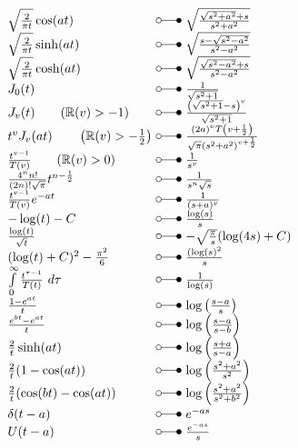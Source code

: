 \[ \begin{array}{@{}l@{ ~ \laplace ~ }l@{}}
\sqrt{\frac{2}{\pi t}} \cos(at) &
    \sqrt{\frac{\sqrt{s^2 + a^2} + s}{s^2 + a^2}} \\
\sqrt{\frac{2}{\pi t}} \sinh(at) &
    \sqrt{\frac{s - \sqrt{s^2 - a^2}}{s^2 - a^2}} \\
\sqrt{\frac{2}{\pi t}} \cosh(at) &
    \sqrt{\frac{\sqrt{s^2 - a^2} + s}{s^2 - a^2}} \\
J_0(t) &
    \frac{1}{\sqrt{s^2 + 1}} \\
J_v(t) \qquad (\mathbb{R}(v) > -1) &
    \frac{\left(\sqrt{s^2 + 1} - s\right)^v}{\sqrt{s^2 + 1}} \\
t^v J_v(at) \qquad \left(\mathbb{R}(v) > -\frac{1}{2}\right) &
    \frac{(2 a)^v T\left(v + \frac{1}{2}\right)}{\sqrt{\pi}(s^2 + a^2)^{v + \frac{1}{2}}} \\
\frac{t^{v - 1}}{T(v)} \qquad (\mathbb{R}(v) > 0) &
    \frac{1}{s^v} \\
\frac{4^n n!}{(2 n)! \sqrt{\pi}} t^{n - \frac{1}{2}} &
    \frac{1}{s^n \sqrt{s}} \\
\frac{t^{v - 1}}{T(v)} e^{-at} &
    \frac{1}{(s + a)^v} \\
-\log(t) - C &
    \frac{\log(s)}{s} \\
\frac{\log(t)}{\sqrt{t}} &
    -\sqrt{\frac{\pi}{s}} (\log(4s) + C) \\
(\log(t) + C)^2 - \frac{\pi^2}{6} &
    \frac{(\log(s)^2}{s} \\
\int\limits_0^\infty \frac{t^{\tau - 1}}{T(t)} ~d\tau &
    \frac{1}{\log(s)} \\
\frac{1 - e^{at}}{t} &
    \log\left(\frac{s - a}{s}\right) \\
\frac{e^{bt} - e^{at}}{t} &
    \log\left(\frac{s - a}{s - b}\right) \\
\frac{2}{t} \sinh(at) &
    \log\left(\frac{s + a}{s - a}\right) \\
\frac{2}{t} (1 - \cos(at)) &
    \log\left(\frac{s^2 + a^2}{s^2}\right) \\
\frac{2}{t} (\cos(bt) - \cos(at)) &
    \log\left(\frac{s^2 + a^2}{s^2 + b^2}\right) \\
\delta(t - a) &
    e^{-as} \\
U(t - a) &
    \frac{e^{-as}}{s} \\
\end{array} \]

